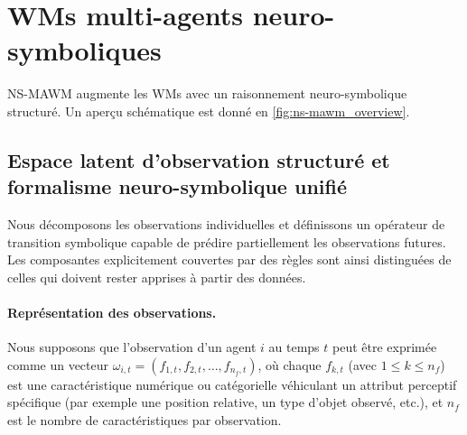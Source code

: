 \documentclass[final]{jfsma}
\theoremstyle{plain}
\theoremstyle{definition}
\theoremstyle{remark}
\begin{document}
\section{WMs multi-agents neuro-symboliques}
\label{sec:method}

NS-MAWM augmente les WMs avec un raisonnement neuro-symbolique structuré. Un aperçu schématique est donné en \autoref{fig:ns-mawm_overview}.

\subsection{Espace latent d'observation structuré et formalisme neuro-symbolique unifié}
\label{sec:ns}

Nous décomposons les observations individuelles et définissons un opérateur de transition symbolique capable de prédire partiellement les observations futures. Les composantes explicitement couvertes par des règles sont ainsi distinguées de celles qui doivent rester apprises à partir des données.

\paragraph{Représentation des observations.} Nous supposons que l'observation d'un agent $i$ au temps $t$ peut être exprimée comme un vecteur $\omega_{i,t} = (f_{1,t}, f_{2,t}, \ldots, f_{n_f,t})$, où chaque $f_{k,t}$ (avec $1 \leq k \leq n_f$) est une caractéristique numérique ou catégorielle véhiculant un attribut perceptif spécifique (par exemple une position relative, un type d'objet observé, etc.), et $n_f$ est le nombre de caractéristiques par observation.
\end{document}
